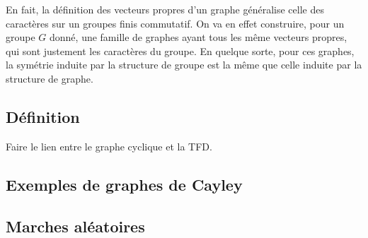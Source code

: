 En fait, la définition des vecteurs propres d'un graphe généralise celle des caractères sur un groupes finis commutatif. On va en effet construire, pour un groupe $G$ donné, une famille de graphes ayant tous les même vecteurs propres, qui sont justement les caractères du groupe. En quelque sorte, pour ces graphes, la symétrie induite par la structure de groupe est la même que celle induite par la structure de graphe.
\subsection{Définition}
\label{sect2-graphe-cayley-defn} 


\mathspace{}
\begin{defn}

\end{defn}\noindent
Faire le lien entre le graphe cyclique et la TFD.
\subsection{Exemples de graphes de Cayley}
\label{sect2-exmp-cayley} 


\subsection{Marches aléatoires}
\label{sect2-marches-aleatoires} 


